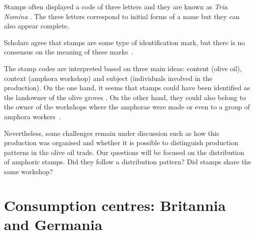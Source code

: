 \documentclass[review]{elsarticle}
\begin{document}
Stamps often displayed a code of three letters and they are known as \textit{Tria Nomina} \citep{berni_millet_amphora_1996}. The three letters correspond to initial forms of a name but they can also appear complete. 

Scholars agree that stamps are some type of identification mark, but there is no consensus on the meaning of these marks~\citep{rodriguez_baetican_1998}. 


The stamp codes are interpreted based on three main ideas: content (olive oil), context (amphora workshop) and subject (individuals involved in the production). On the one hand, it seems that stamps could have been identified as the landowner of the olive groves \citep{rodriguez_economioleicola_1977}. On the other hand, they could also belong to the owner of the workshops where the amphorae were made or even to a group of amphora workers~\citep{berni_millet_epigrafianforica_2008}. 

Nevertheless, some challenges remain under discussion such as how this production was organised and whether it is possible to distinguish production patterns in the olive oil trade. Our questions will be focused on the distribution of amphoric stamps. Did they follow a distribution pattern? Did stamps share the same workshop? 



\section{Consumption centres: Britannia and Germania}
\end{document}

